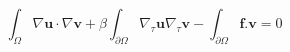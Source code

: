 \documentclass{article}
\begin{document}
$$
\int_{\Omega}{\nabla\textbf{u}\cdot\nabla\textbf{v}}+\beta \int_{\partial \Omega} 
\nabla_\tau \textbf{u} \nabla_\tau \textbf{v}  
-\int_{\partial \Omega}{\textbf{f}.\textbf{v}} = 0
$$
\end{document}
